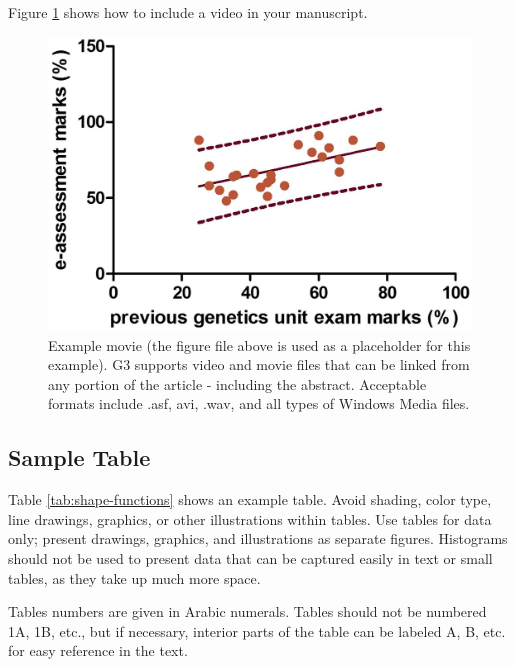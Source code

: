 \documentclass[9pt,twocolumn,twoside]{g3_article/gsag3jnl}
\begin{document}
Figure \ref{video:spectrum} shows how to include a video in your manuscript.

\begin{figure}[htbp]
\renewcommand{\familydefault}{\sfdefault}\normalfont
\centering
\includegraphics[width=\linewidth]{images/example-figure-g3}
\caption{Example movie (the figure file above is used as a placeholder for this example). G3 supports video and movie files that can be linked from any portion of the article - including the abstract. Acceptable formats include .asf, avi, .wav, and all types of Windows Media files.   
}%
\label{video:spectrum}
\end{figure}


\subsection*{Sample Table}

Table \ref{tab:shape-functions} shows an example table. Avoid shading, color type, line drawings, graphics, or other illustrations within tables. Use tables for data only; present drawings, graphics, and illustrations as separate figures. Histograms should not be used to present data that can be captured easily in text or small tables, as they take up much more space.  

Tables numbers are given in Arabic numerals. Tables should not be numbered 1A, 1B, etc., but if necessary, interior parts of the table can be labeled A, B, etc. for easy reference in the text.  
\end{document}
